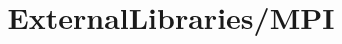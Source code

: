 \documentclass{article}
\begin{document}
\title{ExternalLibraries/MPI}

\maketitle


\end{document}
